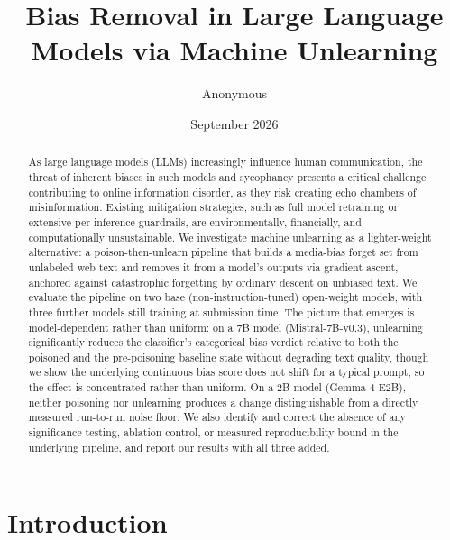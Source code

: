 \documentclass[runningheads]{llncs}
\begin{document}
\title{Bias Removal in Large Language Models via Machine Unlearning}
\author{Anonymous}
\date{September 2026}

\maketitle

\begin{abstract}
As large language models (LLMs) increasingly influence human communication, the threat of inherent biases in such models and sycophancy presents a critical challenge contributing to online information disorder, as they risk creating echo chambers of misinformation. Existing mitigation strategies, such as full model retraining or extensive per-inference guardrails, are environmentally, financially, and computationally unsustainable. We investigate machine unlearning as a lighter-weight alternative: a poison-then-unlearn pipeline that builds a media-bias forget set from unlabeled web text and removes it from a model's outputs via gradient ascent, anchored against catastrophic forgetting by ordinary descent on unbiased text. We evaluate the pipeline on two base (non-instruction-tuned) open-weight models, with three further models still training at submission time. The picture that emerges is model-dependent rather than uniform: on a 7B model (Mistral-7B-v0.3), unlearning significantly reduces the classifier's categorical bias verdict relative to both the poisoned and the pre-poisoning baseline state without degrading text quality, though we show the underlying continuous bias score does not shift for a typical prompt, so the effect is concentrated rather than uniform. On a 2B model (Gemma-4-E2B), neither poisoning nor unlearning produces a change distinguishable from a directly measured run-to-run noise floor. We also identify and correct the absence of any significance testing, ablation control, or measured reproducibility bound in the underlying pipeline, and report our results with all three added.

\end{abstract}

\section{Introduction}
\end{document}
